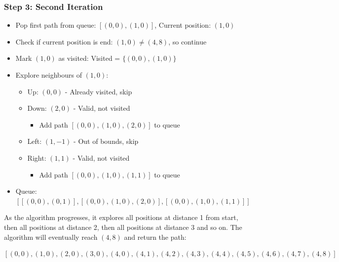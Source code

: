 \subsubsection{Step 3: Second Iteration}
\begin{itemize}
    \item Pop first path from queue: $[(0,0), (1,0)]$, Current position: $(1,0)$
    \item Check if current position is end: $(1,0) \neq (4,8)$, so continue
    \item Mark $(1,0)$ as visited: Visited = $\{(0,0), (1,0)\}$
    \item Explore neighbours of $(1,0)$:
    \begin{itemize}
        \item Up: $(0,0)$ - Already visited, skip
        \item Down: $(2,0)$ - Valid, not visited
        \begin{itemize}
            \item Add path $[(0,0), (1,0), (2,0)]$ to queue
        \end{itemize}
        \item Left: $(1,-1)$ - Out of bounds, skip
        \item Right: $(1,1)$ - Valid, not visited
        \begin{itemize}
            \item Add path $[(0,0), (1,0), (1,1)]$ to queue
        \end{itemize}
    \end{itemize}
    \item Queue: $[[(0,0), (0,1)], [(0,0), (1,0), (2,0)], [(0,0), (1,0), (1,1)]]$
\end{itemize}

As the algorithm progresses, it explores all positions at distance 1 from start, then all positions at distance 2, then all positions at distance 3 and so on. The algorithm will eventually reach $(4,8)$ and return the path:
\begin{center}
$[(0,0), (1,0), (2,0), (3,0), (4,0), (4,1), (4,2), (4,3), (4,4), (4,5), (4,6), (4,7), (4,8)]$
\end{center}


